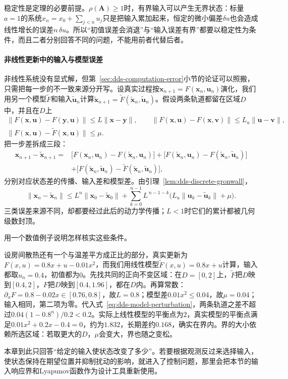 稳定性是定理的必要前提。$\rho(\bm A)\geq1$时，有界输入可以产生无界状态：标量$a=1$的系统$x_n=x_0+\sum_{j<n}u_j$只是把输入累加起来，恒定的微小偏差$\delta u$也会造成线性增长的误差$n\,\delta u$。所以“初值误差会消退”与“输入误差有界”都要以稳定性为条件，而且二者分别回答不同的问题，不能用前者代替后者。

\paragraph{非线性更新中的输入与模型误差}
非线性系统没有显式解，但第~\ref{sec:dds-computation-error}小节的论证可以照搬，只需把每一步的不一致来源分开写。设真实过程按$\bm x_{n+1}=F(\bm x_n,\bm u_n)$演化，我们用另一个模型$\tilde F$和输入$\tilde{\bm u}_n$计算$\tilde{\bm x}_{n+1}=\tilde F(\tilde{\bm x}_n,\tilde{\bm u}_n)$。假设两条轨道都留在区域$D$中，并且在$D$上
\[
  \begin{gathered}
  \lVert F(\bm x,\bm u)-F(\bm y,\bm u)\rVert\leq L\lVert\bm x-\bm y\rVert,\qquad
  \lVert F(\bm x,\bm u)-F(\bm x,\bm v)\rVert\leq L_u\lVert\bm u-\bm v\rVert,\\
  \lVert F(\bm x,\bm u)-\tilde F(\bm x,\bm u)\rVert\leq\mu .
  \end{gathered}
\]
把一步差拆成三段：
\[
  \begin{aligned}
  \bm x_{n+1}-\tilde{\bm x}_{n+1}
  ={}&\bigl[F(\bm x_n,\bm u_n)-F(\tilde{\bm x}_n,\bm u_n)\bigr]
  +\bigl[F(\tilde{\bm x}_n,\bm u_n)-F(\tilde{\bm x}_n,\tilde{\bm u}_n)\bigr]\\
  &+\bigl[F(\tilde{\bm x}_n,\tilde{\bm u}_n)-\tilde F(\tilde{\bm x}_n,\tilde{\bm u}_n)\bigr],
  \end{aligned}
\]
分别对应状态差的传播、输入差和模型差。由引理~\ref{lem:dds-discrete-gronwall}，
\begin{equation}
  \lVert\bm x_n-\tilde{\bm x}_n\rVert\leq L^n\lVert\bm x_0-\tilde{\bm x}_0\rVert+\sum_{k=0}^{n-1}L^{\,n-1-k}\bigl(L_u\lVert\bm u_k-\tilde{\bm u}_k\rVert+\mu\bigr).
  \label{eq:dds-model-perturbation}
\end{equation}
三类误差来源不同，却都要经过此后的动力学传播；$L<1$时它们的累计都被几何级数封顶。

用一个数值例子说明怎样核实这些条件。

\begin{example}[线性模型代替带平方散热的温度模型]
\label{ex:dds-model-mismatch}
设房间散热还有一个与温差平方成正比的部分，真实更新为$F(x,u)=0.8x+u-0.01x^2$，而我们用线性模型$\tilde F(x,u)=0.8x+u$计算，输入都取$u_n=0.4$，初值都为$0$。先找共同的正向不变区域：在$D=[0,2]$上，$\tilde F$把$D$映到$[0.4,2]$，$F$把$D$映到$[0.4,1.96]$，都在$D$内。再算常数：$\partial_xF=0.8-0.02x\in[0.76,0.8]$，故$L=0.8$；模型差$0.01x^2\leq0.04$，故$\mu=0.04$；输入相同，第二项为零。代入式~\eqref{eq:dds-model-perturbation}，两条轨道之差不超过$0.04(1-0.8^n)/0.2<0.2$。实际上线性模型的平衡点为$2$，真实模型的平衡点满足$0.01x^2+0.2x-0.4=0$，约为$1.832$，长期差约$0.168$，确实在界内。界的大小依赖所选区域：若取更大的$D$，$\mu$会变大，界也随之变松。
\end{example}

本章到此只回答“给定的输入使状态改变了多少”。若要根据观测反过来选择输入，使状态保持在期望位置并抑制扰动的影响，就进入了控制问题，那里会把本节的输入响应界和Lyapunov函数作为设计工具重新使用。
